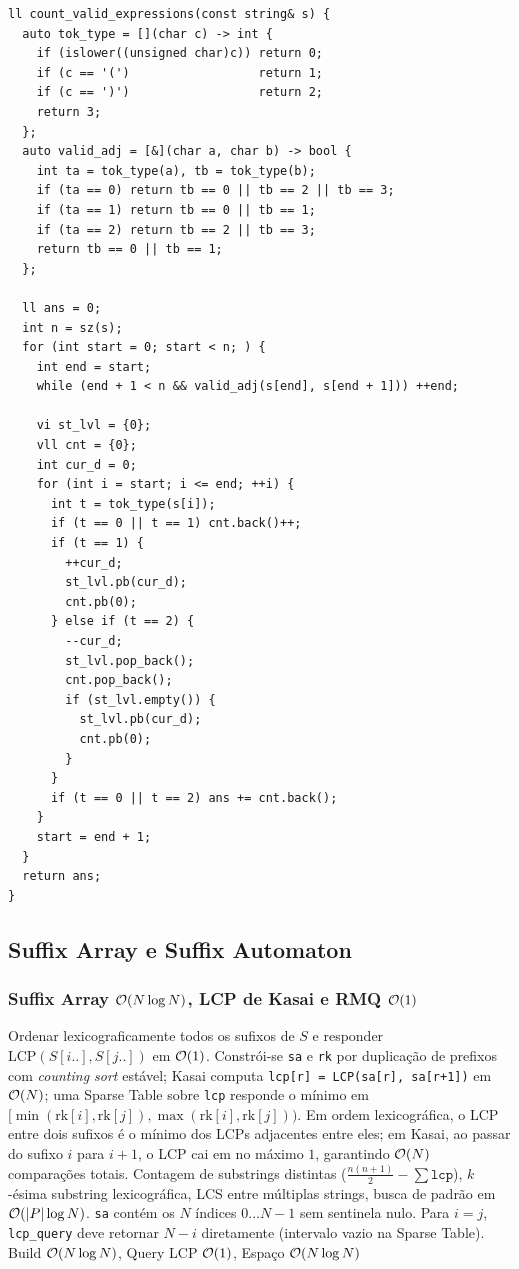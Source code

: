 \begin{lstlisting}
ll count_valid_expressions(const string& s) {
  auto tok_type = [](char c) -> int {
    if (islower((unsigned char)c)) return 0;
    if (c == '(')                  return 1;
    if (c == ')')                  return 2;
    return 3;
  };
  auto valid_adj = [&](char a, char b) -> bool {
    int ta = tok_type(a), tb = tok_type(b);
    if (ta == 0) return tb == 0 || tb == 2 || tb == 3;
    if (ta == 1) return tb == 0 || tb == 1;
    if (ta == 2) return tb == 2 || tb == 3;
    return tb == 0 || tb == 1;
  };

  ll ans = 0;
  int n = sz(s);
  for (int start = 0; start < n; ) {
    int end = start;
    while (end + 1 < n && valid_adj(s[end], s[end + 1])) ++end;

    vi st_lvl = {0};
    vll cnt = {0};
    int cur_d = 0;
    for (int i = start; i <= end; ++i) {
      int t = tok_type(s[i]);
      if (t == 0 || t == 1) cnt.back()++;
      if (t == 1) {
        ++cur_d;
        st_lvl.pb(cur_d);
        cnt.pb(0);
      } else if (t == 2) {
        --cur_d;
        st_lvl.pop_back();
        cnt.pop_back();
        if (st_lvl.empty()) {
          st_lvl.pb(cur_d);
          cnt.pb(0);
        }
      }
      if (t == 0 || t == 2) ans += cnt.back();
    }
    start = end + 1;
  }
  return ans;
}
\end{lstlisting}

\subsection{Suffix Array e Suffix Automaton}

\subsubsection{Suffix Array $\mathcal{O}(N \log N)$, LCP de Kasai e RMQ $\mathcal{O}(1)$}
\algobox
  {Ordenar lexicograficamente todos os sufixos de $S$ e responder $\text{LCP}(S[i..], S[j..])$ em $\mathcal{O}(1)$.}
  {Constrói-se \texttt{sa} e \texttt{rk} por duplicação de prefixos com \emph{counting sort} estável; Kasai computa \texttt{lcp[r] = LCP(sa[r], sa[r+1])} em $\mathcal{O}(N)$; uma Sparse Table sobre \texttt{lcp} responde o mínimo em $[\min(\text{rk}[i], \text{rk}[j]), \max(\text{rk}[i], \text{rk}[j]))$.}
  {Em ordem lexicográfica, o LCP entre dois sufixos é o mínimo dos LCPs adjacentes entre eles; em Kasai, ao passar do sufixo $i$ para $i+1$, o LCP cai em no máximo $1$, garantindo $\mathcal{O}(N)$ comparações totais.}
  {Contagem de substrings distintas ($\frac{n(n+1)}{2} - \sum \texttt{lcp}$), $k$-ésima substring lexicográfica, LCS entre múltiplas strings, busca de padrão em $\mathcal{O}(|P|\log N)$.}
  {\texttt{sa} contém os $N$ índices $0 \dots N-1$ sem sentinela nulo. Para $i = j$, \texttt{lcp\_query} deve retornar $N - i$ diretamente (intervalo vazio na Sparse Table).}
  {Build $\mathcal{O}(N \log N)$, Query LCP $\mathcal{O}(1)$, Espaço $\mathcal{O}(N \log N)$}

